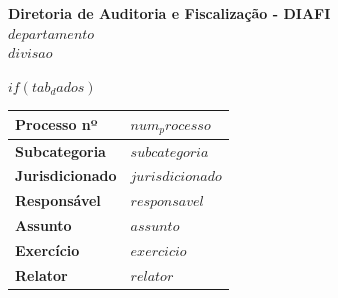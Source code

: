 \documentclass[$if(fontsize)$$fontsize$,$endif$$if(lang)$$lang$,$endif$$if(papersize)$$papersize$,$endif$$for(classoption)$$classoption$$sep$,$endfor$]{$documentclass$}
\begin{document}


\thispagestyle{empty}







\thispagestyle{firstpage}\vspace*{0.05cm}





\vspace{-1cm}

\begin{center}
	{\textbf{Diretoria de Auditoria e Fiscalização - DIAFI}} \\
	$departamento$ \\ %
	$divisao$ %
\end{center}

$if(tab_dados)$

\vspace{-1cm}
\begin{center}
\begin{tabular}{|p{3.5cm}|p{12cm}|}
	\hline
	\textbf{Processo nº} & $num_processo$ \\
	\hline
	\textbf{Subcategoria} & $subcategoria$ \\
	\hline
	\textbf{Jurisdicionado} & $jurisdicionado$ \\
	\hline
	\textbf{Responsável} & $responsavel$ \\
	\hline
	\textbf{Assunto} & $assunto$ \\
	\hline
	\textbf{Exercício}  & $exercicio$ \\
	\hline
	\textbf{Relator}  & $relator$ \\
	\hline
\end{tabular}
\end{center}
\end{document}
